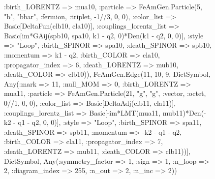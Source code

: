 \documentclass{revtex4}
\begin{document}
\begin{figure}[!htb]
\begin{center}
{:birth_LORENTZ => mua10, :particle => FeAmGen.Particle(5, "b", "bbar", :fermion, :triplet, -1//3, 0, 0), :color_list => Basic[DeltaFun(clb10, cla10)], :couplings_lorentz_list => Basic[im*GAij(spb10, spa10, k1 - q2, 0)*Den(k1 - q2, 0, 0)], :style => "Loop", :birth_SPINOR => spa10, :death_SPINOR => spb10, :momentum => k1 - q2, :birth_COLOR => cla10, :propagator_index => 6, :death_LORENTZ => mub10, :death_COLOR => clb10)), FeAmGen.Edge(11, 10, 9, Dict{Symbol, Any}(:mark => 11, :null_MOM => 0, :birth_LORENTZ => mua11, :particle => FeAmGen.Particle(21, "g", "g", :vector, :octet, 0//1, 0, 0), :color_list => Basic[DeltaAdj(clb11, cla11)], :couplings_lorentz_list => Basic[-im*LMT(mua11, mub11)*Den(-k2 - q1 - q2, 0, 0)], :style => "Loop", :birth_SPINOR => spa11, :death_SPINOR => spb11, :momentum => -k2 - q1 - q2, :birth_COLOR => cla11, :propagator_index => 7, :death_LORENTZ => mub11, :death_COLOR => clb11))], Dict{Symbol, Any}(:symmetry_factor => 1, :sign => 1, :n_loop => 2, :diagram_index => 255, :n_out => 2, :n_inc => 2)) 
}
\end{center}
\end{figure}
\end{document}
